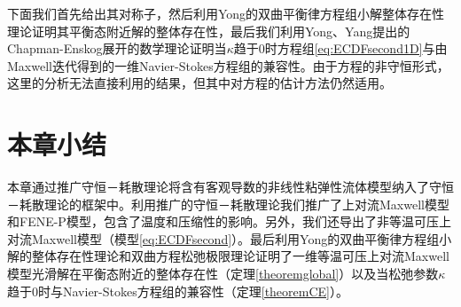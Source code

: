 下面我们首先给出其对称子，然后利用Yong的双曲平衡律方程组小解整体存在性理论\cite{yong2004entropy}证明其平衡态附近解的整体存在性，最后我们利用Yong、Yang提出的Chapman-Enskog展开的数学理论\cite{yang2015validity}证明当$\kappa$趋于$0$时方程组\eqref{eq:ECDFsecond1D}与由Maxwell迭代得到的一维Navier-Stokes方程组的兼容性。由于方程的非守恒形式，这里的分析无法直接利用\cite{yong2004entropy,yang2015validity}的结果，但其中对方程的估计方法仍然适用。



\section{本章小结}
本章通过推广守恒－耗散理论将含有客观导数的非线性粘弹性流体模型纳入了守恒－耗散理论的框架中。利用推广的守恒－耗散理论我们推广了上对流Maxwell模型和FENE-P模型，包含了温度和压缩性的影响。另外，我们还导出了非等温可压上对流Maxwell模型（模型\eqref{eq:ECDFsecond}）。最后利用Yong的双曲平衡律方程组小解的整体存在性理论和双曲方程松弛极限理论证明了一维等温可压上对流Maxwell模型光滑解在平衡态附近的整体存在性（定理\ref{theoremglobal}）以及当松弛参数$\kappa$趋于$0$时与Navier-Stokes方程组的兼容性（定理\ref{theoremCE}）。



% 
